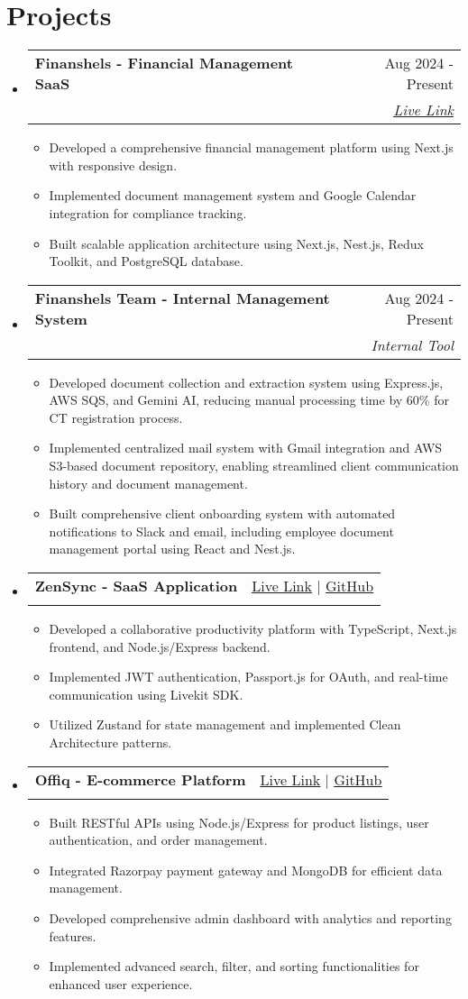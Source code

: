 \documentclass[letterpaper,11pt]{article}
\makeatletter
\newcommand{\resumeItem}[1]{\item\small{#1}}
\newcommand{\resumeSubheading}[4]{
  \vspace{-2pt}\item
    \begin{tabular*}{0.97\textwidth}[t]{l@{\extracolsep{\fill}}r}
      \textbf{#1} & #2 \\
      \textit{\small#3} & \textit{\small #4} \\
    \end{tabular*}\vspace{-8pt}
}
\newcommand{\resumeSubHeadingListStart}{\begin{itemize}[leftmargin=0.15in, label={}]}
\newcommand{\resumeSubHeadingListEnd}{\end{itemize}\vspace{-6pt}}
\newcommand{\resumeItemListStart}{\begin{itemize}}
\newcommand{\resumeItemListEnd}{\end{itemize}\vspace{-6pt}}
\makeatother
\begin{document}
\section{Projects}
\resumeSubHeadingListStart
\resumeSubheading
{\textbf{Finanshels} - Financial Management SaaS}{Aug 2024 - Present}
{}{\color{blue}\underline{\href{https://www.finanshels.com/finanshels-app}{Live Link}}}
\resumeItemListStart
\resumeItem{Developed a comprehensive financial management platform using Next.js with responsive design.}
\resumeItem{Implemented document management system and Google Calendar integration for compliance tracking.}
\resumeItem{Built scalable application architecture using Next.js, Nest.js, Redux Toolkit, and PostgreSQL database.}
\resumeItemListEnd
\resumeSubheading
{\textbf{Finanshels Team} - Internal Management System}{Aug 2024 - Present}
{}{Internal Tool}
\resumeItemListStart
\resumeItem{Developed document collection and extraction system using Express.js, AWS SQS, and Gemini AI, reducing manual processing time by 60\% for CT registration process.}
\resumeItem{Implemented centralized mail system with Gmail integration and AWS S3-based document repository, enabling streamlined client communication history and document management.}
\resumeItem{Built comprehensive client onboarding system with automated notifications to Slack and email, including employee document management portal using React and Nest.js.}
\resumeItemListEnd
\resumeSubheading
{\textbf{ZenSync} - SaaS Application}{\color{blue}\underline{\href{https://www.zensync.ltd/}{Live Link}} \color{black} $|$ \color{blue}\underline{\href{https://github.com/dreamographer/zenSync-backend}{GitHub}}}
{}{}
\resumeItemListStart
\resumeItem{Developed a collaborative productivity platform with TypeScript, Next.js frontend, and Node.js/Express backend.}
\resumeItem{Implemented JWT authentication, Passport.js for OAuth, and real-time communication using Livekit SDK.}
\resumeItem{Utilized Zustand for state management and implemented Clean Architecture patterns.}
\resumeItemListEnd
\resumeSubheading
{\textbf{Offiq} - E-commerce Platform}{\color{blue}\underline{\href{https://www.offiq.shop/}{Live Link}} \color{black} $|$ \color{blue}\underline{\href{https://github.com/dreamographer/OFFIQ}{GitHub}}}
{}{}
\resumeItemListStart
\resumeItem{Built RESTful APIs using Node.js/Express for product listings, user authentication, and order management.}
\resumeItem{Integrated Razorpay payment gateway and MongoDB for efficient data management.}
\resumeItem{Developed comprehensive admin dashboard with analytics and reporting features.}
\resumeItem{Implemented advanced search, filter, and sorting functionalities for enhanced user experience.}
\resumeItemListEnd
\resumeSubHeadingListEnd
\end{document}
